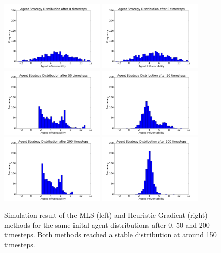 \documentclass[11pt]{article}
\begin{document}
\begin{figure}
  \centering
  \quad
  \includegraphics[width=0.45\textwidth]{figures/heuristic_vs_mls_1.png}
  \includegraphics[width=0.45\textwidth]{figures/heuristic_vs_mls_4.png}
  \includegraphics[width=0.45\textwidth]{figures/heuristic_vs_mls_2.png}
  \includegraphics[width=0.45\textwidth]{figures/heuristic_vs_mls_5.png}
  \includegraphics[width=0.45\textwidth]{figures/heuristic_vs_mls_3.png}
  \includegraphics[width=0.45\textwidth]{figures/heuristic_vs_mls_6.png}
  \caption[Comparison MLS and Heuristic Gradient]{Simulation result of the MLS (left) and Heuristic Gradient (right) methods for the same inital agent distributions after 0, 50 and 200 timesteps. Both methods reached a stable distribution at around 150 timesteps.}
  \label{fig:heuristicvsmls}
\end{figure}
\end{document}
